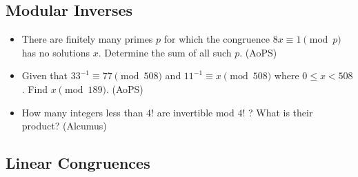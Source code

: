 \documentclass{article}
\begin{document}
\subsection{Modular Inverses}


\begin{itemize}

\item There are finitely many primes $p$ for which the congruence $8x\equiv 1\pmod{p}$ has no solutions $x$. Determine the sum of all such $p$. (AoPS)

\item Given that $33^{-1}\equiv 77\pmod{508}$ and $11^{-1}\equiv x\pmod{508}$ where $0\le x<508$. Find $x\pmod{189}$. (AoPS)

\item How many integers less than $4!$ are invertible mod $4!$ ? What is their product? (Alcumus)

\end{itemize}


\subsection{Linear Congruences}
\end{document}
